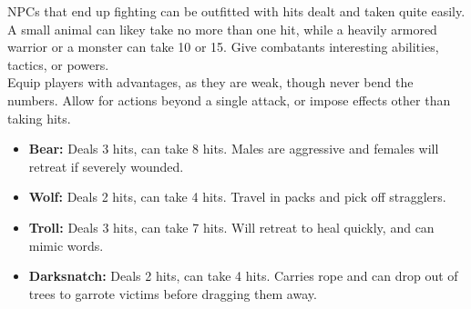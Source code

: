 \documentclass{article}
\begin{document}
\begin{multicols}{2}
NPCs that end up fighting can be outfitted with hits dealt and taken quite easily.
A small animal can likey take no more than one hit, while a heavily armored warrior or a monster can take 10 or 15. Give combatants interesting abilities, tactics, or powers. \\

Equip players with advantages, as they are weak, though never bend the numbers.
Allow for actions beyond a single attack, or impose effects other than taking hits. \\

\begin{itemize}
\item \textbf{Bear:} Deals 3 hits, can take 8 hits. Males are aggressive and females will retreat if severely wounded.
\item \textbf{Wolf: } Deals 2 hits, can take 4 hits. Travel in packs and pick off stragglers.
\item \textbf{Troll: } Deals 3 hits, can take 7 hits. Will retreat to heal quickly, and can mimic words.
\item \textbf{Darksnatch: } Deals 2 hits, can take 4 hits. Carries rope and can drop out of trees to garrote victims before dragging them away. 
\end{itemize}



\end{multicols}
\end{document}
